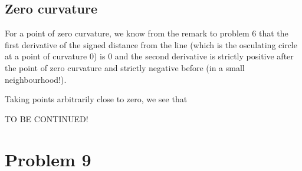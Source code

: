 \subsection{Zero curvature}

For a point of zero curvature, we know from the remark to problem 6 that the first derivative of the signed distance from the line (which is the osculating circle at a point of curvature 0) is 0 and the second derivative is strictly positive after the point of zero curvature and strictly negative before (in a small neighbourhood!).

Taking points arbitrarily close to zero, we see that

TO BE CONTINUED!


\section{Problem 9}
